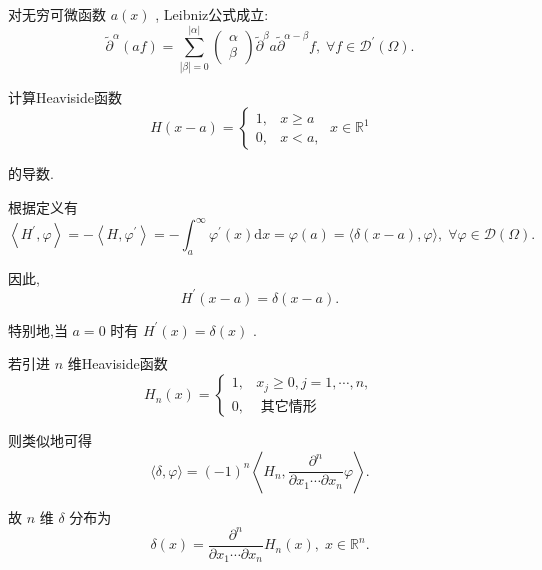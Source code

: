 \documentclass[lang=cn,newtx,10pt,scheme=chinese,thmcnt=chapter]{elegantbook}
\newcommand{\dif}{\mathrm{d}}
\begin{document}
对无穷可微函数 \(a\left( x\right)\) , Leibniz公式成立:
\begin{equation*}
{\widetilde{\partial } }^{\alpha }\left( {af}\right)  = \mathop{\sum }\limits_{{\left| \beta \right|  = 0}}^{\left| \alpha \right| }\left( \begin{array}{l} \alpha \\  \beta  \end{array}\right) {\widetilde{\partial } }^{\beta }a{\widetilde{\partial } }^{\alpha  - \beta }f,\;\forall f \in  {\mathcal{D}}^{\prime }\left( \Omega \right) .
\end{equation*}
\begin{example}
  计算Heaviside函数
\begin{equation*}
  H\left( {x - a}\right)  = \left\{  {\begin{array}{ll} 1, & x \geq  a \\  0, & x < a, \end{array}\;x \in  {\mathbb{R}}^{1}}\right.
  \end{equation*}
  
  的导数.
\end{example}
\begin{solution}根据定义有
\begin{equation*}
\left\langle  {{H}^{\prime },\varphi }\right\rangle   =  - \left\langle  {H,{\varphi }^{\prime }}\right\rangle   =  - {\int }_{a}^{\infty }{\varphi }^{\prime }\left( x\right) {\dif x} = \varphi \left( a\right)  = \langle \delta \left( {x - a}\right) ,\varphi \rangle ,\;\forall \varphi  \in  \mathcal{D}\left( \Omega \right) .
\end{equation*}

因此,
\begin{equation*}
{H}^{\prime }\left( {x - a}\right)  = \delta \left( {x - a}\right) .
\end{equation*}

特别地,当 \(a = 0\) 时有 \({H}^{\prime }\left( x\right)  = \delta \left( x\right)\) .

若引进 \(n\) 维Heaviside函数
\begin{equation*}
{H}_{n}\left( x\right)  = \left\{  \begin{array}{ll} 1, & {x}_{j} \geq  0,j = 1,\cdots ,n, \\  0, & \text{ 其它情形 } \end{array}\right.
\end{equation*}

则类似地可得
\begin{equation*}
\langle \delta ,\varphi \rangle  = {\left( -1\right) }^{n}\left\langle  {{H}_{n},\frac{{\partial }^{n}}{\partial {x}_{1}\cdots \partial {x}_{n}}\varphi }\right\rangle  .
\end{equation*}

故 \(n\) 维 \(\delta\) 分布为
\begin{equation*}
\delta \left( x\right)  = \frac{{\partial }^{n}}{\partial {x}_{1}\cdots \partial {x}_{n}}{H}_{n}\left( x\right) ,\;x \in  {\mathbb{R}}^{n}.
\end{equation*}\end{solution}
\end{document}
